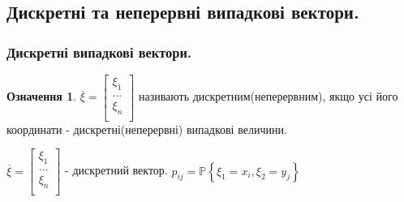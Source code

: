 \documentclass[fontsize=14pt,a4paper]{scrartcl}
\theoremstyle{definition}
\newtheorem*{defo}{Означення}
\theoremstyle{remark}
\theoremstyle{definition}
\theoremstyle{definition}
\begin{document}
\subsection{Дискретні та неперервні випадкові вектори.}
\subsubsection{Дискретні випадкові вектори.}
\begin{defo}
	$ \overline{\xi} = \begin{bmatrix}
	  \xi_1 \\
	...\\
	\xi_n\\
	\end{bmatrix}$ називають дискретним(неперервним), якщо усі його координати - дискретні(неперервні) випадкові величини.
\end{defo}
$
\overline{\xi} = \begin{bmatrix}
	\xi_1 \\
...\\
\xi_n\\
\end{bmatrix}
$ - дискретний вектор.
$p_{ij} = \mathbb{P} \left\lbrace \xi_1 = x_i , \xi_2= y_j \right\rbrace
\qquad $
\end{document}
